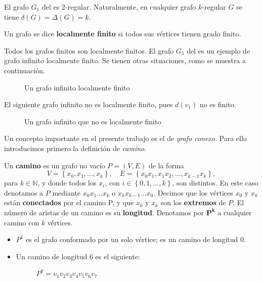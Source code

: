 El grafo $G_1$ del  es $2$-regular. Naturalmente, en cualquier grafo $k$-regular $G$ se tiene $\delta(G)=\Delta(G)=k$.
\begin{Def}
   Un grafo se dice \textbf{localmente finito} si todos sus vértices tienen grado finito. 
\end{Def}
Todos los grafos finitos son localmente finitos. El grafo $G_5$ del  es un ejemplo de grafo infinito localmente finito. Se tienen otras situaciones, como se muestra a continuación.
\begin{Ejm}
   \phantom{o}
   \begin{figure}[H]
     \centering
       \resizebox{0.4\textwidth}{!}{} 
     \caption{Un grafo infinito localmente finito}
   \end{figure}
\end{Ejm}
\begin{Ejm}
   El siguiente grafo infinito no es localmente finito, pues $d(v_1)$ no es finito.
   \begin{figure}[H]
     \centering
       \resizebox{0.45\textwidth}{!}{} 
     \caption{Un grafo infinito que no es localmente finito}
   \end{figure}
\end{Ejm}
Un concepto importante en el presente trabajo es el de \textit{grafo conexo}. Para ello introducimos primero la definición de \textit{camino}.
\begin{Def}
   Un \textbf{camino} es un grafo no vacío $P=(V,E)$ de la forma
   $$
   V=\left\lbrace x_0, x_1, \dots, x_k\right\rbrace, \quad E=\left\lbrace x_0x_1, x_1x_2, \dots , x_{k-1}x_k\right\rbrace,
   $$
   para $k\in \mathbb{N}$, y donde todos los $x_i$, con $i\in \left\lbrace 0,1,\dots,k\right\rbrace$, son distintos. En este caso denotamos a $P$ mediante $x_0x_1\dots x_k$ o $x_kx_{k-1}\dots x_0$. Decimos que los vértices $x_0$ y $x_k$ están \textbf{conectados} por el camino P, y que $x_0$ y $x_k$ son los \textbf{extremos} de $P$. El número de aristas de un camino es su \textbf{longitud}. Denotamos por $\bm{P^k}$ a cualquier camino con $k$ vértices.
\end{Def}
\begin{Ejm}
   \phantom{o}
   \begin{itemize}
      \item $P^1$ es el grafo conformado por un solo vértice; es un camino de longitud $0$.
      \item Un camino de longitud $6$ es el siguiente:
      \begin{figure}[H]
        \centering
          \resizebox{0.3\textwidth}{!}{}
        \caption{$P^7=v_1v_2v_3v_4v_5v_6v_7$}
      \end{figure}
   \end{itemize}
\end{Ejm}
